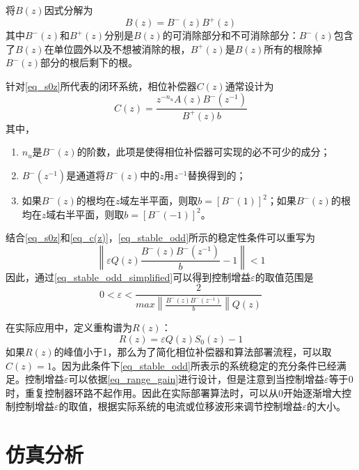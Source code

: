 将$B(z)$因式分解为
\begin{equation}
B(z)=B^-(z)B^+(z)
\end{equation}
其中$B^-(z)$和$B^+(z)$分别是$B(z)$的可消除部分和不可消除部分：$B^-(z)$包含了$B(z)$在单位圆外以及不想被消除的根，$B^+(z)$是$B(z)$所有的根除掉$B^-(z)$部分的根后剩下的根。

针对\autoref{eq_s0z}所代表的闭环系统，相位补偿器$C(z)$通常设计为
\begin{equation}
\label{eq_c(z)}
C(z)=\frac{z^{-n_u}A(z)B^-(z^{-1})}{B^+(z)b}
\end{equation}
其中，
\begin{enumerate}
	\item $n_u$是$B^-(z)$的阶数，此项是使得相位补偿器可实现的必不可少的成分；
	\item $B^-(z^{-1})$是通道将$B^-(z)$中的$z$用$z^{-1}$替换得到的；
	\item 如果$B^-(z)$的根均在$z$域左半平面，则取$b={\left[ B^-(1)\right]}^2$；如果$B^-(z)$的根均在$z$域右半平面，则取$b={\left[ B^-(-1)\right]}^2$。
\end{enumerate}
结合\autoref{eq_s0z}和\autoref{eq_c(z)}，\autoref{eq_stable_odd}所示的稳定性条件可以重写为
\begin{equation}
	\label{eq_stable_odd_simplified}
	\left\|\varepsilon Q(z)\frac{B^-(z)B^-(z^{-1})}{b}-1\right\|<1
\end{equation}
因此，通过\autoref{eq_stable_odd_simplified}可以得到控制增益$\varepsilon$的取值范围是
\begin{equation}
	\label{eq_range_gain}
	0 < \varepsilon < \frac{2}{max\left \| \frac{B^-(z)B^-(z^{-1})}{b}\right \|Q(z)}
\end{equation}

在实际应用中，定义重构谱为$R(z)$：
\begin{equation}
	\label{eq_Rz}
	R(z)=\varepsilon Q(z)S_0(z)	- 1
\end{equation}
如果$R(z)$的峰值小于1，那么为了简化相位补偿器和算法部署流程，可以取$C(z)=1$。因为此条件下\autoref{eq_stable_odd}所表示的系统稳定的充分条件已经满足。控制增益$\varepsilon$可以依据\autoref{eq_range_gain}进行设计，但是注意到当控制增益$\varepsilon$等于$0$时，重复控制器环路不起作用。因此在实际部署算法时，可以从$0$开始逐渐增大控制控制增益$\varepsilon$的取值，根据实际系统的电流或位移波形来调节控制增益$\varepsilon$的大小。
\section{仿真分析}

